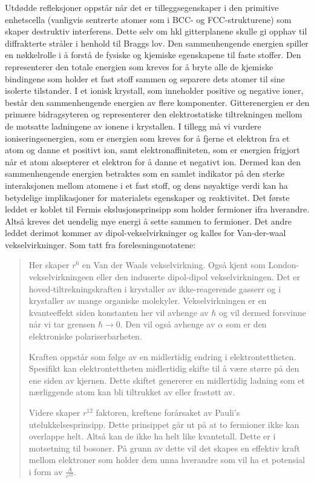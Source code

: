 \documentclass{article}
\begin{document}
Utdødde refleksjoner oppstår når det er tilleggsegenskaper i den primitive enhetscella (vanligvis sentrerte atomer som i BCC- og FCC-strukturene) som skaper destruktiv interferens. Dette selv om hkl gitterplanene skulle gi opphav til diffrakterte stråler i henhold til Braggs lov.
Den sammenhengende energien spiller en nøkkelrolle i å forstå de fysiske og kjemiske egenskapene til faste stoffer. Den representerer den totale energien som kreves for å bryte alle de kjemiske bindingene som holder et fast stoff sammen og separere dets atomer til sine isolerte tilstander. I et ionisk krystall, som inneholder positive og negative ioner, består den sammenhengende energien av flere komponenter. Gitterenergien er den primære bidragsyteren og representerer den elektrostatiske tiltrekningen mellom de motsatte ladningene av ionene i krystallen. I tillegg må vi vurdere ioniseringsenergien, som er energien som kreves for å fjerne et elektron fra et atom og danne et positivt ion, samt elektronaffiniteten, som er energien frigjort når et atom aksepterer et elektron for å danne et negativt ion. Dermed kan den sammenhengende energien betraktes som en samlet indikator på den sterke interaksjonen mellom atomene i et fast stoff, og dens nøyaktige verdi kan ha betydelige implikasjoner for materialets egenskaper og reaktivitet.
Det første leddet er koblet til Fermis ekslusjonsprinsipp som holder fermioner ifra hverandre. Altså kreves det uendelig mye energi å sette sammen to fermioner. Det andre leddet derimot kommer av dipol-vekselvirkninger og kalles for Van-der-waal vekselvirkninger. Som tatt fra forelesningsnotatene:

\begin{quote}
    Her skaper $r^6$ en Van der Waals vekselvirkning. Også kjent som London-vekselvirkningeen eller den induserte dipol-dipol vekselvirkningen. Det er hoved-tiltrekningskraften i krystaller av ikke-reagerende gasserr og i krystaller av mange organiske molekyler. Vekselvirkningen er en kvanteeffekt siden konstanten her vil avhenge av $\hbar$ og vil dermed forsvinne når vi tar grensen $\hbar \rightarrow 0$. Den vil også avhenge av $\alpha$ som er den elektroniske polariserbarheten.

    Kraften oppstår som følge av en midlertidig endring i elektrontettheten. Spesifikt kan elektrontettheten midlertidig skifte til å være større på den ene siden av kjernen. Dette skiftet genererer en midlertidig ladning som et nærliggende atom kan bli tiltrukket av eller frastøtt av.
    
    Videre skaper $r^{12}$ faktoren, kreftene forårsaket av Pauli's utelukkelsesprinsipp. Dette prinsippet går ut på at to fermioner ikke kan overlappe helt. Altså kan de ikke ha helt like kvantetall. Dette er i motsetning til bosoner. På grunn av dette vil det skapes en effektiv kraft mellom elektroner som holder dem unna hverandre som vil ha et potensial i form av $\frac{A}{r^{12}}$.
\end{quote}
\end{document}
